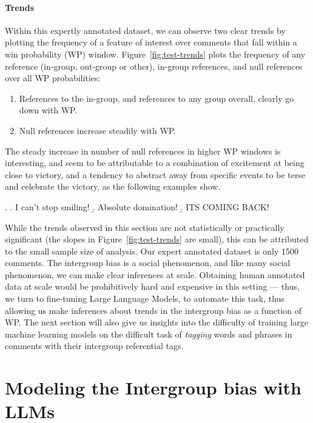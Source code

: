 \paragraph{Trends} Within this expertly annotated dataset, we can observe two clear trends by plotting the frequency of a feature of interest over comments that fall within a win probability (WP) window. Figure~\ref{fig:test-trends} plots the frequency of any reference (in-group, out-group or other), in-group references, and null references over all WP probabilities:

\begin{enumerate}
    \item References to the in-group, and references to any group overall, clearly go down with WP.
    \item Null references increase steadily with WP.
\end{enumerate}

The steady increase in number of null references in higher WP windows is interesting, and seem to be attributable to a combination of excitement at being close to victory, and a tendency to abstract away from specific events to be terse and celebrate the victory, as the following examples show.

\ex. \a. I can't stop smiling!
     \b. Absolute domination!
     \b. ITS COMING BACK!

While the trends observed in this section are not statistically or practically significant (the slopes in Figure~\ref{fig:test-trends} are small), this can be attributed to the small sample size of analysis. Our expert annotated dataset is only 1500 comments. The intergroup bias is a social phenomenon, and like many social phenomenon, we can make clear inferences at scale. Obtaining human annotated data at scale would be prohibitively hard and expensive in this setting --- thus, we turn to fine-tuning Large Language Models, to automate this task, thus allowing us make inferences about trends in the intergroup bias as a function of WP. The next section will also give us insights into the difficulty of training large machine learning models on the difficult task of \emph{tagging} words and phrases in comments with their intergroup referential tags.

\section{Modeling the Intergroup bias with LLMs}
\label{sec:football-models}

